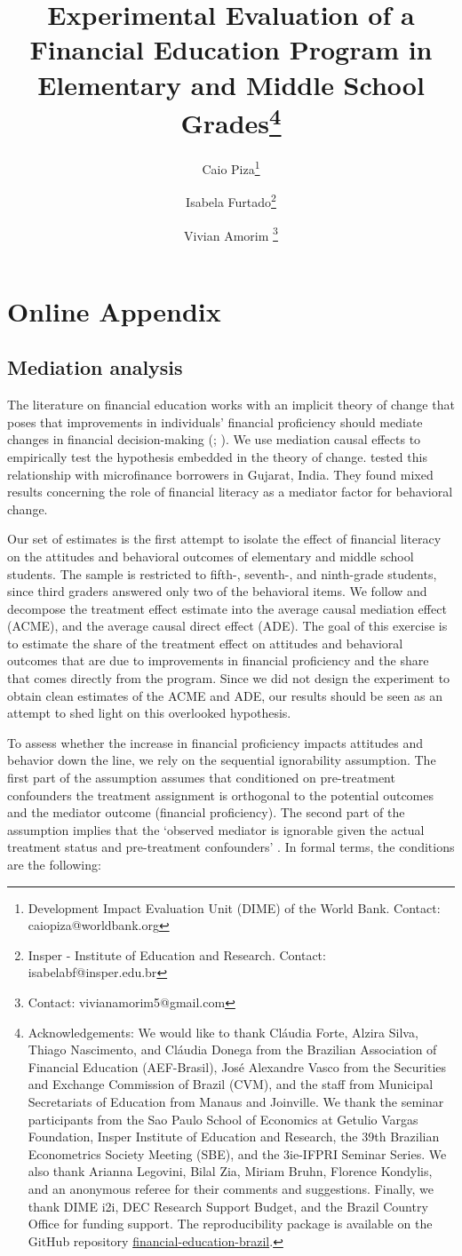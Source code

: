 \documentclass[
	12pt,				%
	oneside,			%
	a4paper,			%
	]{article}
\title{Experimental Evaluation of a Financial Education Program in Elementary and Middle School Grades\thanks{\scriptsize Acknowledgements: We would like to thank Cláudia Forte, Alzira Silva, Thiago Nascimento, and Cláudia Donega from the Brazilian Association of Financial Education (AEF-Brasil), José Alexandre Vasco from the Securities and Exchange Commission of Brazil (CVM), and the staff from Municipal Secretariats of Education from Manaus and Joinville. We thank the seminar participants from the Sao Paulo School of Economics at Getulio Vargas Foundation, Insper Institute of Education and Research, the 39th Brazilian Econometrics Society Meeting (SBE), and the 3ie-IFPRI Seminar Series. We also thank Arianna Legovini, Bilal Zia, Miriam Bruhn, Florence Kondylis, and an anonymous referee for their comments and suggestions. Finally, we thank DIME i2i, DEC Research Support Budget, and the Brazil Country Office for funding support. The reproducibility package is available on the GitHub repository \href{https://github.com/vivianamorim/financial-education-brazil/tree/main/Datawork/Do\%20files}{financial-education-brazil}.}}
\author{Caio Piza\thanks{\scriptsize Development Impact Evaluation Unit (DIME) of the World Bank. Contact: caiopiza@worldbank.org} \and Isabela Furtado\thanks{\scriptsize Insper - Institute of Education and Research. Contact: isabelabf@insper.edu.br} \and Vivian Amorim \thanks{\scriptsize
 Contact: vivianamorim5@gmail.com}}
\date{}
\begin{document}
\maketitle

\renewcommand{\thefigure}{OA\arabic{figure}}
\renewcommand{\thetable}{OA\arabic{table}}
\renewcommand{\theequation}{OA\arabic{equation}}

\section{Online Appendix}



\subsection{Mediation analysis} \label{sec:mediation}

The literature on financial education works with an implicit theory of change that poses that improvements in individuals' financial proficiency should mediate changes in financial decision-making (\citealt{Fernandes2014}; \citealt{Lusardi2014}). We use mediation causal effects to empirically test the hypothesis embedded in the theory of change. 
 \cite{carpena2020causal} tested this relationship with microfinance borrowers in Gujarat, India. They found mixed results concerning the role of financial literacy as a mediator factor for behavioral change. 

Our set of estimates is the first attempt to isolate the effect of financial literacy on the attitudes and behavioral outcomes of elementary and middle school students. The sample is restricted to fifth-, seventh-, and ninth-grade students, since third graders answered only two of the behavioral items. We follow \cite{imai2011unpacking} and decompose the treatment effect estimate into the average causal mediation effect (ACME), and the average causal direct effect (ADE). The goal of this exercise is to estimate the share of the treatment effect on attitudes and behavioral outcomes that are due to improvements in financial proficiency and the share that comes directly from the program. Since we did not design the experiment to obtain clean estimates of the ACME and ADE, our results should be seen as an attempt to shed light on this overlooked hypothesis.   

To assess whether the increase in financial proficiency impacts attitudes and behavior down the line, we rely on the sequential ignorability assumption. The first part of the assumption assumes that conditioned on pre-treatment confounders the treatment assignment is orthogonal to the potential outcomes and the mediator outcome (financial proficiency). The second part of the assumption implies that the `observed mediator is ignorable given the actual treatment status and pre-treatment confounders' \citep{imai2011unpacking}. In formal terms, the conditions are the following:
\end{document}
